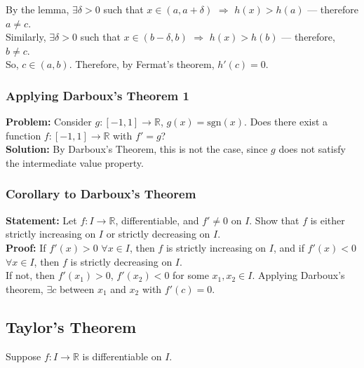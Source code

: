 \documentclass[10pt]{extarticle}
\newcommand{\R}{\mathbb{R}}
\begin{document}
    By the lemma, $\exists \delta > 0$ such that $x\in (a,a+\delta)$ $\Rightarrow$ $h(x) > h(a)$ --- therefore $a\neq c$.\\

    Similarly, $\exists \delta > 0$ such that $x\in (b-\delta,b)$ $\Rightarrow$ $h(x) > h(b)$ --- therefore, $b\neq c$.\\

    So, $c\in (a,b)$. Therefore, by Fermat's theorem, $h'(c) = 0$.
    \subsubsection{Applying Darboux's Theorem 1}%
    \textbf{Problem:} Consider $g: [-1,1] \rightarrow \R$, $g(x) = \text{sgn}(x)$. Does there exist a function $f: [-1,1]\rightarrow \R$ with $f' = g$?\\

    \textbf{Solution:} By Darboux's Theorem, this is not the case, since $g$ does not satisfy the intermediate value property.
    \subsubsection{Corollary to Darboux's Theorem}%
    \textbf{Statement:} Let $f: I\rightarrow\R$, differentiable, and $f'\neq 0$ on $I$. Show that $f$ is either strictly increasing on $I$ or strictly decreasing on $I$.\\

    \textbf{Proof:} If $f'(x) > 0$ $\forall x\in I$, then $f$ is strictly increasing on $I$, and if $f'(x) < 0$ $\forall x\in I$, then $f$ is strictly decreasing on $I$.\\

    If not, then $f'(x_1) > 0$, $f'(x_2) < 0$ for some $x_1,x_2\in I$. Applying Darboux's theorem, $\exists c$ between $x_1$ and $x_2$ with $f'(c) = 0$.
  \subsection{Taylor's Theorem}%
  Suppose $f: I\rightarrow\R$ is differentiable on $I$.
\end{document}
